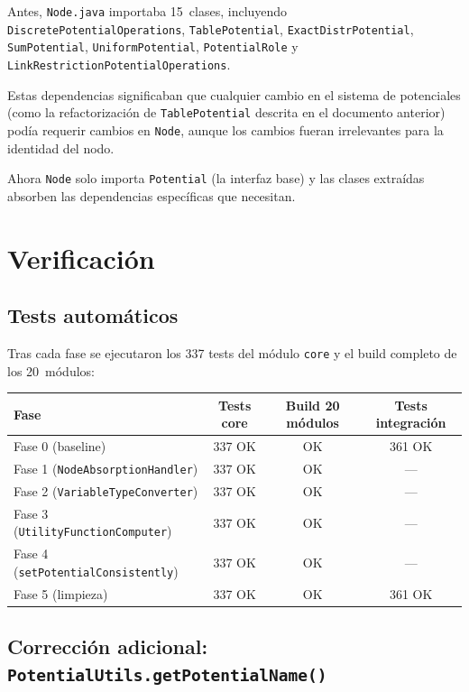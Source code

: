 \documentclass[11pt,a4paper]{article}
\newcommand{\code}[1]{\texttt{#1}}
\begin{document}
Antes, \code{Node.java} importaba 15~clases, incluyendo
\code{DiscretePotentialOperations}, \code{TablePotential},
\code{ExactDistrPotential}, \code{SumPotential},
\code{UniformPotential}, \code{PotentialRole} y
\code{LinkRestrictionPotentialOperations}.

Estas dependencias significaban que cualquier cambio en el sistema de
potenciales (como la refactorizaci\'on de \code{TablePotential} descrita
en el documento anterior) pod\'ia requerir cambios en \code{Node},
aunque los cambios fueran irrelevantes para la identidad del nodo.

Ahora \code{Node} solo importa \code{Potential} (la interfaz base) y
las clases extra\'idas absorben las dependencias espec\'ificas que
necesitan.

\section{Verificaci\'on}

\subsection{Tests autom\'aticos}

Tras cada fase se ejecutaron los 337 tests del m\'odulo \code{core} y
el build completo de los 20~m\'odulos:

\begin{center}
\begin{tabular}{lccc}
\toprule
\textbf{Fase} & \textbf{Tests core} & \textbf{Build 20 m\'odulos} &
\textbf{Tests integraci\'on} \\
\midrule
Fase 0 (baseline) & 337 OK & OK & 361 OK \\
Fase 1 (\code{NodeAbsorptionHandler}) & 337 OK & OK & --- \\
Fase 2 (\code{VariableTypeConverter}) & 337 OK & OK & --- \\
Fase 3 (\code{UtilityFunctionComputer}) & 337 OK & OK & --- \\
Fase 4 (\code{setPotentialConsistently}) & 337 OK & OK & --- \\
Fase 5 (limpieza) & 337 OK & OK & 361 OK \\
\bottomrule
\end{tabular}
\end{center}

\subsection{Correcci\'on adicional: \code{PotentialUtils.getPotentialName()}}
\end{document}
